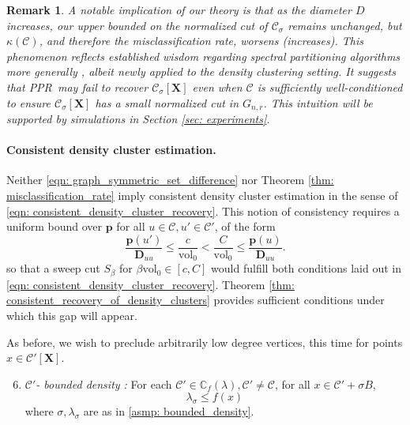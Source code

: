 \documentclass{article}
\newcommand{\vol}{\mathrm{vol}}
\newcommand{\1}{\mathbf{1}}
\newcommand{\pbf}{\mathbf{p}}
\newcommand{\Xbf}{\mathbf{X}}
\newcommand{\Dbf}{\mathbf{D}}
\newcommand{\Cbb}{\mathbb{C}}
\newcommand{\Cset}{\mathcal{C}}
\newcommand{\Csig}{\Cset_{\sigma}}
\newcommand{\pprspace}{{\sc PPR~}}
\theoremstyle{aldenthm}
\theoremstyle{aldenrmrk}
\newtheorem{remark}{Remark}
\begin{document}
\begin{remark}
	A notable implication of our theory is that as the diameter $D$ increases, our upper bounded on the normalized cut of $\Csig$ remains unchanged, but $\kappa(\Cset)$, and therefore the misclassification rate, worsens (increases). This phenomenon reflects established wisdom regarding spectral partitioning algorithms more generally \cite{guattery1995, hein2010}, albeit newly applied to the density clustering setting. It suggests that \pprspace may fail to recover $\Csig[\Xbf]$ even when $\Cset$ is sufficiently well-conditioned to ensure $\Csig[\Xbf]$ has a small normalized cut in $G_{n,r}$. This intuition will be supported by simulations in Section \ref{sec: experiments}.
\end{remark}

\paragraph{Consistent density cluster estimation.}

Neither \eqref{eqn: graph_symmetric_set_difference} nor Theorem \ref{thm: misclassification_rate} imply consistent density cluster estimation in the sense of \eqref{eqn: consistent_density_cluster_recovery}. This notion of consistency requires a uniform bound over $\pbf$ for all $u \in \Cset, u' \in \Cset'$, of the form
\begin{equation}
\label{eqn: ppr_gap}
\frac{\pbf(u')}{\Dbf_{uu}} \leq \frac{c}{\vol_0} < \frac{C}{\vol_0} \leq \frac{\pbf(u)}{\Dbf_{uu}}.
\end{equation}
so that a sweep cut $S_{\beta}$ for $\beta \vol_0 \in [c,C]$ would fulfill both conditions laid out in \eqref{eqn: consistent_density_cluster_recovery}.  Theorem \ref{thm: consistent_recovery_of_density_clusters} provides sufficient conditions under which this gap will appear. 

As before, we wish to preclude arbitrarily low degree vertices, this time for points $x \in \Cset'[\Xbf]$.
\begin{enumerate}[label=(A\arabic*)]
	\setcounter{enumi}{5}
	\item 
	\label{asmp: C'_bounded_density}
	\emph{$\Cset'$- bounded density :} For each $\Cset' \in \Cbb_f(\lambda), \Cset' \neq \Cset$, for all $x \in \Cset' + \sigma B$,
	\begin{equation*}
	\lambda_{\sigma} \leq f(x)
	\end{equation*}
	where $\sigma,\lambda_{\sigma}$ are as in \ref{asmp: bounded_density}.
\end{enumerate}
\end{document}
